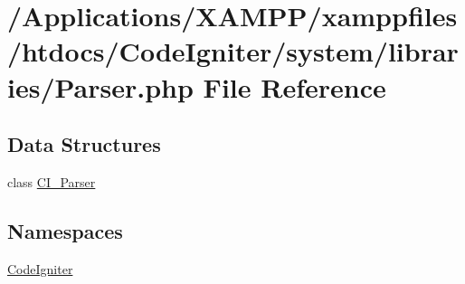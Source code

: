 \hypertarget{system_2libraries_2_parser_8php}{}\section{/\+Applications/\+X\+A\+M\+P\+P/xamppfiles/htdocs/\+Code\+Igniter/system/libraries/\+Parser.php File Reference}
\label{system_2libraries_2_parser_8php}
\subsection*{Data Structures}
\begin{DoxyCompactItemize}
\item 
class \mbox{\hyperlink{class_c_i___parser}{C\+I\+\_\+\+Parser}}
\end{DoxyCompactItemize}
\subsection*{Namespaces}
\begin{DoxyCompactItemize}
\item 
 \mbox{\hyperlink{namespace_code_igniter}{Code\+Igniter}}
\end{DoxyCompactItemize}
